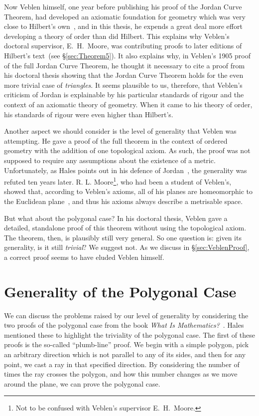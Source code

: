 Now Veblen himself, one year before publishing his proof of the Jordan Curve Theorem, had developed an axiomatic foundation for geometry which was very close to Hilbert's own~\cite{Veblenphd}, and in this thesis, he expends a great deal more effort developing a theory of order than did Hilbert. This explains why Veblen's doctoral supervisor, E.~H.~Moore, was contributing proofs to later editions of Hilbert's text~(see \S\ref{sec:Theorem5}). It also explains why, in Veblen's 1905 proof of the full Jordan Curve Theorem, he thought it necessary to cite a proof from his doctoral thesis showing that the Jordan Curve Theorem holds for the even more trivial case of \emph{triangles}. It seems plausible to us, therefore, that Veblen's criticism of Jordan is explainable by his particular standards of rigour and the context of an axiomatic theory of geometry. When it came to his theory of order, his standards of rigour were even higher than Hilbert's.

Another aspect we should consider is the level of generality that Veblen was attempting. He gave a proof of the full theorem in the context of ordered geometry with the addition of one topological axiom. As such, the proof was not supposed to require any assumptions about the existence of a metric. Unfortunately, as Hales points out in his defence of Jordan~\cite{HalesJordansProof}, the generality was refuted ten years later. R. L. Moore\footnote{Not to be confused with Veblen's supervisor E.~H.~Moore.}, who had been a student of Veblen's, %
showed that, according to Veblen's axioms, all of his planes are homeomorphic to the Euclidean plane~\cite{MooreSitus}, and thus his axioms always describe a metrisable space.

But what about the polygonal case? In his doctoral thesis, Veblen gave a detailed, standalone proof of this theorem without using the topological axiom. The theorem, then, is plausibly still very general. So one question is: given its generality, is it still \emph{trivial}? We suggest not. As we discuss in \S\ref{sec:VeblenProof}, a correct proof seems to have eluded Veblen himself.

\section{Generality of the Polygonal Case}\label{sec:JordanCurveGenerality}
We can discuss the problems raised by our level of generality by considering the two proofs of the polygonal case from the book \emph{What Is Mathematics?}~\cite{WhatIsMathematics}. Hales mentioned these to highlight the triviality of the polygonal case. The first of these proofs is the so-called ``plumb-line'' proof. We begin with a simple polygon, pick an arbitrary direction which is not parallel to any of its sides, and then for any point, we cast a ray in that specified direction. By considering the number of times the ray crosses the polygon, and how this number changes as we move around the plane, we can prove the polygonal case.

